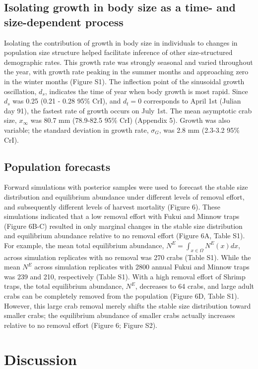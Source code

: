 \documentclass{article}
\begin{document}
\subsection{Isolating growth in body size as a time- and size-dependent process}

Isolating the contribution of growth in body size in individuals to changes in population size structure helped facilitate inference of other size-structured demographic rates. This growth rate was strongly seasonal and varied throughout the year, with growth rate peaking in the summer months and approaching zero in the winter months (Figure S1). The inflection point of the sinusoidal growth oscillation, $d_s$, indicates the time of year when body growth is most rapid. Since $d_s$ was 0.25 (0.21 - 0.28 95\% CrI), and $d_t = 0$ corresponds to April 1st (Julian day 91), the fastest rate of growth occurs on July 1st. The mean asymptotic crab size, $x_{\infty}$ was 80.7 mm (78.9-82.5 95\% CrI) (Appendix 5). Growth was also variable; the standard deviation in growth rate, $\sigma_G$, was 2.8 mm (2.3-3.2 95\% CrI).

\subsection{Population forecasts}

Forward simulations with posterior samples were used to forecast the stable size distribution and equilibrium abundance under different levels of removal effort, and subsequently different levels of harvest mortality (Figure 6). These simulations indicated that a low removal effort with Fukui and Minnow traps (Figure 6B-C) resulted in only marginal changes in the stable size distribution and equilibrium abundance relative to no removal effort (Figure 6A, Table S1). For example, the mean total equilibrium abundance, $N^{E} = \int_{x \in \Omega}N^E(x)dx$, across simulation replicates with no removal was 270 crabs (Table S1). While the mean $N^{E}$ across simulation replicates with 2800 annual Fukui and Minnow traps was 239 and 210, respectively (Table S1). With a high removal effort of Shrimp traps, the total equilibrium abundance, $N^{E}$, decreases to 64 crabs, and large adult crabs can be completely removed from the population (Figure 6D, Table S1). However, this large crab removal merely shifts the stable size distribution toward smaller crabs; the equilibrium abundance of smaller crabs actually increases relative to no removal effort (Figure 6; Figure S2).

\section{Discussion}
\end{document}
